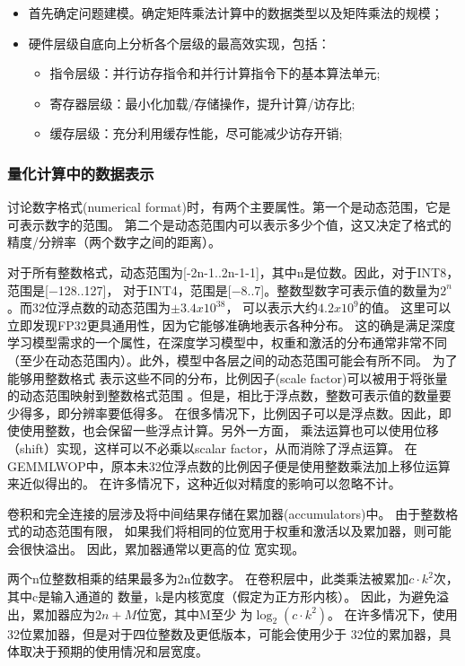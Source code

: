 \begin{itemize}
  \item 首先确定问题建模。确定矩阵乘法计算中的数据类型以及矩阵乘法的规模；
  \item 硬件层级自底向上分析各个层级的最高效实现，包括： 
    \begin{itemize}
      \item 指令层级：并行访存指令和并行计算指令下的基本算法单元;
      \item 寄存器层级：最小化加载/存储操作，提升计算/访存比;
      \item 缓存层级：充分利用缓存性能，尽可能减少访存开销;
   \end{itemize}
\end{itemize}

\subsubsection{量化计算中的数据表示}

讨论数字格式(numerical format)时，有两个主要属性。第一个是动态范围，它是可表示数字的范围。
第二个是动态范围内可以表示多少个值，这又决定了格式的精度/分辨率（两个数字之间的距离）。

对于所有整数格式，动态范围为[-2n-1..2n-1-1]，其中n是位数。因此，对于INT8，范围是[−128..127]，
对于INT4，范围是[−8..7]。整数型数字可表示值的数量为$2^n$。而32位浮点数的动态范围为$\pm3.4 x 10^38$，
可以表示大约$4.2 x 10^9$的值。 这里可以立即发现FP32更具通用性，因为它能够准确地表示各种分布。
这的确是满足深度学习模型需求的一个属性，在深度学习模型中，权重和激活的分布通常非常不同
（至少在动态范围内）。此外，模型中各层之间的动态范围可能会有所不同。 为了能够用整数格式
表示这些不同的分布，比例因子(scale factor)可以被用于将张量的动态范围映射到整数格式范围
。但是，相比于浮点数，整数可表示值的数量要少得多，即分辨率要低得多。
在很多情况下，比例因子可以是浮点数。因此，即使使用整数，也会保留一些浮点计算。另外一方面，
乘法运算也可以使用位移（shift）实现，这样可以不必乘以scalar factor，从而消除了浮点运算。
在GEMMLWOP中，原本未32位浮点数的比例因子便是使用整数乘法加上移位运算来近似得出的。
在许多情况下，这种近似对精度的影响可以忽略不计。

卷积和完全连接的层涉及将中间结果存储在累加器(accumulators)中。 由于整数格式的动态范围有限，
如果我们将相同的位宽用于权重和激活以及累加器，则可能会很快溢出。 因此，累加器通常以更高的位
宽实现。

两个n位整数相乘的结果最多为2n位数字。 在卷积层中，此类乘法被累加$c·k^2$次，其中c是输入通道的
数量，k是内核宽度（假定为正方形内核）。 因此，为避免溢出，累加器应为$2n + M$位宽，其中M至少
为$\log_2(c⋅k^2)$。 在许多情况下，使用32位累加器，但是对于四位整数及更低版本，可能会使用少于
32位的累加器，具体取决于预期的使用情况和层宽度。


